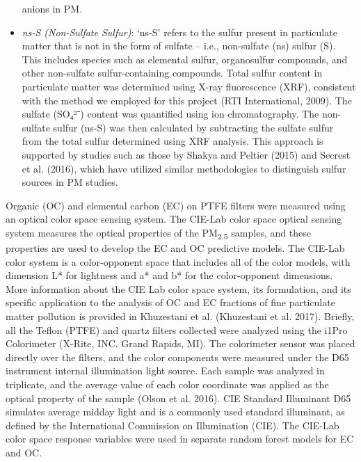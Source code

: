\documentclass[
  letterpaper,
  DIV=11,
  numbers=noendperiod]{scrartcl}
\begin{document}
\begin{itemize}
  anions in PM.
\item
  \emph{ns-S (Non-Sulfate Sulfur)}: `ns-S' refers to the sulfur present
  in particulate matter that is not in the form of sulfate -- i.e.,
  non-sulfate (ns) sulfur (S). This includes species such as elemental
  sulfur, organosulfur compounds, and other non-sulfate
  sulfur-containing compounds. Total sulfur content in particulate
  matter was determined using X-ray fluorescence (XRF), consistent with
  the method we employed for this project (RTI International, 2009). The
  sulfate (SO₄²⁻) content was quantified using ion chromatography. The
  non-sulfate sulfur (ns-S) was then calculated by subtracting the
  sulfate sulfur from the total sulfur determined using XRF analysis.
  This approach is supported by studies such as those by Shakya and
  Peltier (2015) and Secrest et al. (2016), which have utilized similar
  methodologies to distinguish sulfur sources in PM studies.
\end{itemize}

Organic (OC) and elemental carbon (EC) on PTFE filters were measured
using an optical color space sensing system. The CIE-Lab color space
optical sensing system measures the optical properties of the
PM\textsubscript{2.5} samples, and these properties are used to develop
the EC and OC predictive models. The CIE-Lab color system is a
color-opponent space that includes all of the color models, with
dimension L* for lightness and a* and b* for the color-opponent
dimensions. More information about the CIE Lab color space system, its
formulation, and its specific application to the analysis of OC and EC
fractions of fine particulate matter pollution is provided in Khuzestani
et al. (Khuzestani et al. 2017). Briefly, all the Teflon (PTFE) and
quartz filters collected were analyzed using the i1Pro Colorimeter
(X-Rite, INC. Grand Rapids, MI). The colorimeter sensor was placed
directly over the filters, and the color components were measured under
the D65 instrument internal illumination light source. Each sample was
analyzed in triplicate, and the average value of each color coordinate
was applied as the optical property of the sample (Olson et al. 2016).
CIE Standard Illuminant D65 simulates average midday light and is a
commonly used standard illuminant, as defined by the International
Commission on Illumination (CIE). The CIE-Lab color space response
variables were used in separate random forest models for EC and OC.
\end{document}
